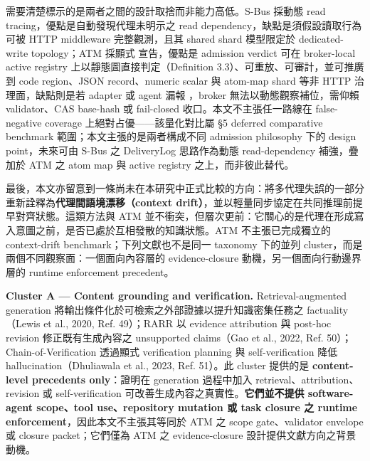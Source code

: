 \documentclass[a4paper,fontset=none]{ctexart}
\begin{document}
需要清楚標示的是兩者之間的設計取捨而非能力高低。S-Bus 採動態 read tracing，優點是自動發現代理未明示之 read dependency，缺點是須假設讀取行為可被 HTTP middleware 完整觀測，且其 shared shard 模型限定於 dedicated-write topology；ATM 採顯式 \texttt{} 宣告，優點是 admission verdict 可在 broker-local active registry 上以靜態圖直接判定（Definition 3.3）、可重放、可審計，並可推廣到 code region、JSON record、numeric scalar 與 atom-map shard 等非 HTTP 治理面，缺點則是若 adapter 或 agent 漏報 \texttt{}，broker 無法以動態觀察補位，需仰賴 validator、CAS base-hash 或 fail-closed 收口。本文不主張任一路線在 false-negative coverage 上絕對占優------該量化對比屬 §5 deferred comparative benchmark 範圍；本文主張的是兩者構成不同 admission philosophy 下的 design point，未來可由 S-Bus 之 DeliveryLog 思路作為動態 read-dependency 補強，疊加於 ATM 之 atom map 與 active registry 之上，而非彼此替代。

最後，本文亦留意到一條尚未在本研究中正式比較的方向：將多代理失誤的一部分重新詮釋為\textbf{代理間語境漂移（context drift）}，並以輕量同步協定在共同推理前提早對齊狀態。這類方法與 ATM 並不衝突，但層次更前：它關心的是代理在形成寫入意圖之前，是否已處於互相發散的知識狀態。ATM 不主張已完成獨立的 context-drift benchmark；下列文獻也不是同一 taxonomy 下的並列 cluster，而是兩個不同觀察面：一個面向內容層的 evidence-closure 動機，另一個面向行動邊界層的 runtime enforcement precedent。

\textbf{Cluster A --- Content grounding and verification.} Retrieval-augmented generation 將輸出條件化於可檢索之外部證據以提升知識密集任務之 factuality（Lewis et al., 2020, Ref. 49）；RARR 以 evidence attribution 與 post-hoc revision 修正既有生成內容之 unsupported claims（Gao et al., 2022, Ref. 50）；Chain-of-Verification 透過顯式 verification planning 與 self-verification 降低 hallucination（Dhuliawala et al., 2023, Ref. 51）。此 cluster 提供的是 \textbf{content-level precedents only}：證明在 generation 過程中加入 retrieval、attribution、revision 或 self-verification 可改善生成內容之真實性。\textbf{它們並不提供 software-agent scope、tool use、repository mutation 或 task closure 之 runtime enforcement}，因此本文不主張其等同於 ATM 之 scope gate、validator envelope 或 closure packet；它們僅為 ATM 之 evidence-closure 設計提供文獻方向之背景動機。
\end{document}
